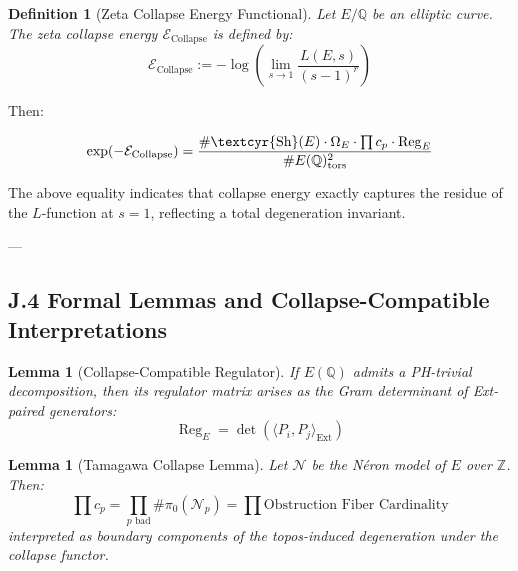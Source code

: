 \documentclass[11pt]{article}
\newtheorem{definition}[theorem]{Definition}
\newtheorem{lemma}[theorem]{Lemma}
\newcommand{\Sha}{\text{\textcyr{Sh}}}
\begin{document}
\begin{definition}[Zeta Collapse Energy Functional]
Let $E/\mathbb{Q}$ be an elliptic curve. The zeta collapse energy $\mathcal{E}_{\text{Collapse}}$ is defined by:
\[
\mathcal{E}_{\text{Collapse}} := -\log \left( \lim_{s \to 1} \frac{L(E,s)}{(s-1)^r} \right)
\]
\end{definition}

Then:

\[
\exp(-\mathcal{E}_{\text{Collapse}}) = \frac{\#\Sha(E)\cdot \Omega_E \cdot \prod c_p \cdot \operatorname{Reg}_E}{\# E(\mathbb{Q})_\text{tors}^2}
\]

The above equality indicates that collapse energy exactly captures the residue of the $L$-function at $s=1$, reflecting a total degeneration invariant.

---

\subsection*{J.4 Formal Lemmas and Collapse-Compatible Interpretations}

\begin{lemma}[Collapse-Compatible Regulator]
If $E(\mathbb{Q})$ admits a PH-trivial decomposition, then its regulator matrix arises as the Gram determinant of Ext-paired generators:
\[
\operatorname{Reg}_E = \det \left( \langle P_i, P_j \rangle_{\text{Ext}} \right)
\]
\end{lemma}

\begin{lemma}[Tamagawa Collapse Lemma]
Let $\mathcal{N}$ be the Néron model of $E$ over $\mathbb{Z}$. Then:
\[
\prod c_p = \prod_{p \text{ bad}} \#\pi_0(\mathcal{N}_p) = \prod \text{Obstruction Fiber Cardinality}
\]
interpreted as boundary components of the topos-induced degeneration under the collapse functor.
\end{lemma}
\end{document}
